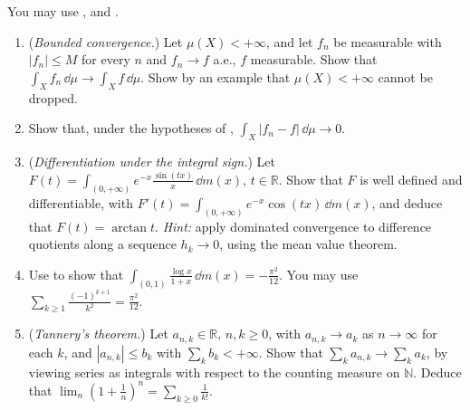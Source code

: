 \begin{exercise}\label{ex:ig-dct-variants}
\medium You may use ,  and
.
\begin{enumerate}[label=(\alph*)]
  \item (\emph{Bounded convergence.}) Let $\mu(X)<+\infty$, and let $f_n$ be measurable with
    $|f_n|\le M$ for every $n$ and $f_n\to f$ a.e., $f$ measurable. Show that
    $\int_Xf_n\,\dd\mu\to\int_Xf\,\dd\mu$. Show by an example that $\mu(X)<+\infty$ cannot be
    dropped.
  \item Show that, under the hypotheses of ,
    $\int_X|f_n-f|\,\dd\mu\to0$.
  \item (\emph{Differentiation under the integral sign.}) Let
    $F(t)=\int_{(0,+\infty)}e^{-x}\frac{\sin(tx)}x\,\dd m(x)$, $t\in\mathbb R$. Show that $F$ is well
    defined and differentiable, with $F'(t)=\int_{(0,+\infty)}e^{-x}\cos(tx)\,\dd m(x)$, and
    deduce that $F(t)=\arctan t$. \emph{Hint:} apply dominated convergence to difference
    quotients along a sequence $h_k\to0$, using the mean value theorem.
  \item Use  to show that
    $\int_{(0,1)}\frac{\log x}{1+x}\,\dd m(x)=-\frac{\pi^2}{12}$. You may use
    $\sum_{k\ge1}\frac{(-1)^{k+1}}{k^2}=\frac{\pi^2}{12}$.
  \item (\emph{Tannery's theorem.}) Let $a_{n,k}\in\mathbb R$, $n,k\ge0$, with
    $a_{n,k}\to a_k$ as $n\to\infty$ for each $k$, and $|a_{n,k}|\le b_k$ with $\sum_kb_k<+\infty$.
    Show that $\sum_ka_{n,k}\to\sum_ka_k$, by viewing series as integrals with respect to the
    counting measure on $\mathbb N$. Deduce that $\lim_n(1+\frac1n)^n=\sum_{k\ge0}\frac1{k!}$.
\end{enumerate}
\end{exercise}

